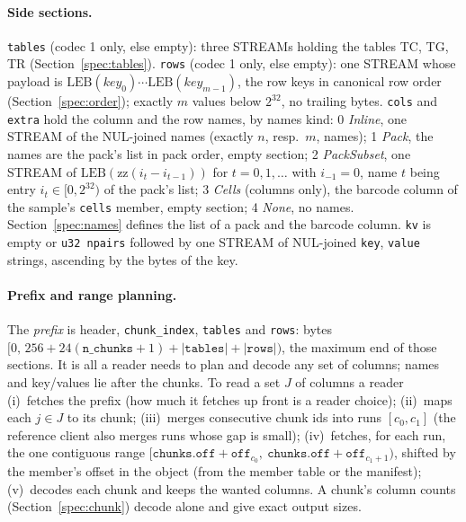 \paragraph{Side sections.}
\texttt{tables} (codec 1 only, else empty): three STREAMs holding the tables TC, TG, TR (Section~\ref{spec:tables}).
\texttt{rows} (codec 1 only, else empty): one STREAM whose payload is $\mathrm{LEB}(\mathit{key}_0)\cdots\mathrm{LEB}(\mathit{key}_{m-1})$,
the row keys in canonical row order (Section~\ref{spec:order}); exactly $m$ values below $2^{32}$, no trailing bytes.
\texttt{cols} and \texttt{extra} hold the column and the row names, by names kind: 0 \emph{Inline}, one STREAM of the
NUL-joined names (exactly $n$, resp.\ $m$, names); 1 \emph{Pack}, the names are the pack's list in pack order, empty
section; 2 \emph{PackSubset}, one STREAM of $\mathrm{LEB}(\mathrm{zz}(i_t-i_{t-1}))$ for $t=0,1,\dots$ with $i_{-1}=0$,
name $t$ being entry $i_t\in[0,2^{32})$ of the pack's list; 3 \emph{Cells} (columns only), the barcode column of the
sample's \texttt{cells} member, empty section; 4 \emph{None}, no names. Section~\ref{spec:names} defines the list of a
pack and the barcode column. \texttt{kv} is empty or \texttt{u32 npairs} followed by one STREAM of NUL-joined
\texttt{key}, \texttt{value} strings, ascending by the bytes of the key.

\paragraph{Prefix and range planning.}
The \emph{prefix} is header, \texttt{chunk\_index}, \texttt{tables} and \texttt{rows}: bytes
$[0,\,256+24(\texttt{n\_chunks}+1)+|\texttt{tables}|+|\texttt{rows}|)$, the maximum end of those sections. It is all
a reader needs to plan and decode any set of columns; names and key/values lie after the chunks. To read a set $J$ of
columns a reader (i)~fetches the prefix (how much it fetches up front is a reader choice); (ii)~maps each
$j\in J$ to its chunk; (iii)~merges consecutive chunk ids into runs
$[c_0,c_1]$ (the reference client also merges runs whose gap is small); (iv)~fetches, for each run, the one contiguous
range $[\texttt{chunks.off}+\texttt{off}_{c_0},\ \texttt{chunks.off}+\texttt{off}_{c_1+1})$, shifted by the member's
offset in the object (from the member table or the manifest); (v)~decodes each chunk and keeps the wanted columns.
A chunk's column counts (Section~\ref{spec:chunk}) decode alone and give exact output sizes.

